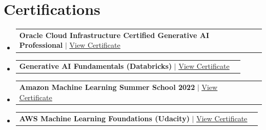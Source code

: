 \documentclass[letterpaper,11pt]{article}
\makeatletter
\newcommand{\resumeProjectHeading}[2]{
        \item
        \begin{tabular*}{0.97\textwidth}{l@{\extracolsep{\fill}}r}
        \small#1 & #2 \\
        \end{tabular*}\vspace{-7pt}
    }
\newcommand{\resumeSubHeadingListStart}{\begin{itemize}[leftmargin=0.15in, label={}]}
\newcommand{\resumeSubHeadingListEnd}{\end{itemize}}
\makeatother
\begin{document}
    \section{Certifications}
    \resumeSubHeadingListStart
        \resumeProjectHeading
            {\textbf{Oracle Cloud Infrastructure Certified Generative AI Professional} $|$ \href{https://catalog-education.oracle.com/ords/certview/sharebadge?id=0512AAC7D2068FE112B1A6E68DB8CBC765B847A44DFBC92B37041027B0254DA6}{\underline{View Certificate}}}{}
        \resumeProjectHeading
            {\textbf{Generative AI Fundamentals (Databricks)} $|$ \href{https://credentials.databricks.com/70cb412e-beb8-4392-a639-b8658e4de1a8\#acc.6W2ghPVN}{\underline{View Certificate}}}{}
        \resumeProjectHeading
            {\textbf{Amazon Machine Learning Summer School 2022} $|$ \href{https://drive.google.com/file/d/1QcnKV_IuvO1V8wPcGkjdq9BOOMUys2dG/view?usp=sharing}{\underline{View Certificate}}}{}
        \resumeProjectHeading
            {\textbf{AWS Machine Learning Foundations (Udacity)} $|$ \href{https://graduation.udacity.com/confirm/UKMFKVLW}{\underline{View Certificate}}}{}
    \resumeSubHeadingListEnd

    
\end{document}
